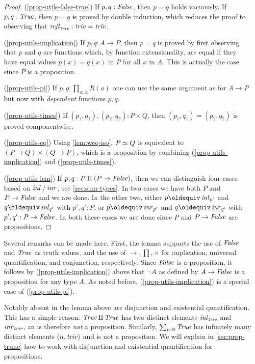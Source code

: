 \begin{proof}
(\ref{prop-utils-false-true})
If $p,q : \mathop{\mathit{False}}$, then $p=q$ holds vacuously.
If $p,q : \mathop{\mathit{True}}$, then $p=q$ is proved by double induction,
which reduces the proof to observing that $\mathop{{\it refl}_{\mathop{\mathit{triv}}}}: \mathop{\mathit{triv}}=\mathop{\mathit{triv}}$.

(\ref{prop-utils-implication})
If $p,q : A\to P$, then $p=q$ is proved by first observing that $p$ and $q$
are functions which, by function extensionality, are equal if they have
equal values $p(x) = q(x)$ in $P$ for all $x$ in $A$. This is
actually the case since $P$ is a proposition.

(\ref{prop-utils-pi})
If $p,q : \prod_{a:A} R(a)$ one can use the same argument as for $A\to P$
but now with \emph{dependent} functions $p,q$.

(\ref{prop-utils-times})
If $(p_1,q_1),(p_2,q_2) : P\times Q$, then $(p_1,q_1)=(p_2,q_2)$
is proved componentwise. 

(\ref{prop-utils-eq})
Using \cref{lem:weq-iso}, $P \simeq Q$ is equivalent to
$(P\to Q)\times(Q\to P)$, which is a proposition by 
combining (\ref{prop-utils-implication}) and (\ref{prop-utils-times}).

(\ref{prop-utils-lem}) 
If $p,q : P\amalg (P\to\mathop{\mathit{False}})$, then we can distinguish four cases
based on $\mathop{{\it inl}_{}}/\mathop{{\it inr}_{}}$, see \cref{sec:sum-types}. In two cases
we have both $P$ and $P\to\mathop{\mathit{False}}$ and we are done. In the other two,
either $p\jdeq \inl{p'}$ and $q\jdeq \inl{q'}$ with $p',q':P$,
or $p\jdeq \inr{p'}$ and $q\jdeq \inr{q'}$ with $p',q':P\to\mathop{\mathit{False}}$.
In both these cases we are done since $P$ and $P\to\mathop{\mathit{False}}$ 
are propositions.
\end{proof}

Several remarks can be made here. First, the lemma supports the
use of $\mathop{\mathit{False}}$ and $\mathop{\mathit{True}}$ as truth values, and the use of
$\to,\prod,\times$ for implication, universal quantification,
and conjunction, respectively. Since $\mathop{\mathit{False}}$ is a proposition,
it follows by (\ref{prop-utils-implication}) above that
$\neg A$ as defined by $A\to\mathop{\mathit{False}}$ is a proposition for any type $A$.
As noted before, (\ref{prop-utils-implication}) is a
special case of (\ref{prop-utils-pi}).

Notably absent in the lemma above are disjunction
and existential quantification. This has a simple reason:
$\mathop{\mathit{True}}\amalg \mathop{\mathit{True}}$ has two distinct elements
$\mathop{{\it inl}_{\mathop{\mathit{triv}}}}$ and $\mathop{{\it inr}_{\mathop{\mathit{triv}}}}$, an is therefore \emph{not} a proposition.
Similarly, $\sum_{n:\mathbb{N}} \mathop{\mathit{True}}$ has infinitely many
distinct elements $(n,\mathop{\mathit{triv}})$ and is not a proposition. We will explain 
in \cref{sec:prop-trunc} how to work with disjunction and 
existential quantification for propositions.

